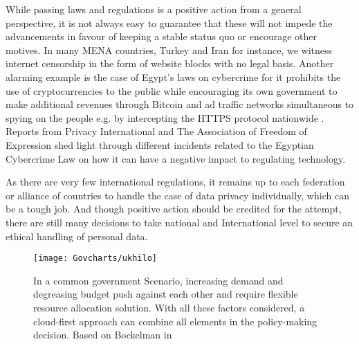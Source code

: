 While passing laws and regulations is a positive action from a general perspective, it is not always easy to guarantee that these will not impede the advancements in favour of keeping a stable status quo or encourage other motives. In many MENA countries, Turkey and Iran for instance, we witness internet censorship in the form of website blocks with no legal basis. Another alarming example is the case of Egypt's laws on cybercrime for it prohibits the use of cryptocurrencies to the public while encouraging its own government to make additional revenues through Bitcoin and ad traffic networks simultaneous to spying on the people e.g. by intercepting the HTTPS protocol nationwide \cite{nilephish}. Reports from Privacy International \cite{pi:egypt} and The Association of Freedom of Expression \cite{afte:eg} shed light through different incidents related to the Egyptian Cybercrime Law on how it can have a negative impact to regulating technology. 

As there are very few international regulations, it remains up to each federation or alliance of countries to handle the case of data privacy individually, which can be a tough job. And though positive action should be credited for the attempt, there are still many decisions to take national and International level to secure an ethical handling of personal data.




\begin{figure}[H]
	\centering

	\caption[Policy-Making strategies]{In a common government Scenario, increasing demand and degreasing budget push against each other and require flexible resource allocation solution. With all these factors considered, a cloud-first approach can combine all elements in the policy-making decision. Based on Bockelman in \cite{aws:pubsecsum}}
	\label{aws:policymaking}
	\texttt{[image: Govcharts/ukhilo]} 
\end{figure}

